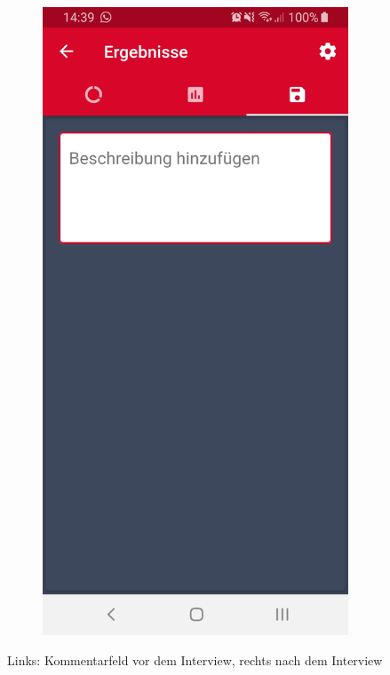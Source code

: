 \begin{figure}[H]
\begin{subfigure}[b]{0.45\textwidth}
		\end{subfigure}
		\hfill
		\begin{subfigure}[b]{0.45\textwidth}
			\includegraphics[width=1\textwidth]{../include/images/usertests/commentTextfield/after}
		\end{subfigure}
		\label{img:commentTextfield}
		\caption{Links: Kommentarfeld vor dem Interview, rechts nach dem Interview}
	\end{figure}

